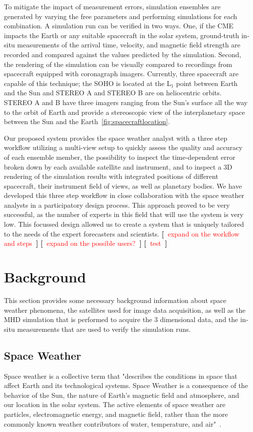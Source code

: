 \documentclass[journal]{vgtc}                %
\newcommand{\todo}[1] {\textbf{[~}\textcolor {red}{#1}\marginpar{\textcolor {red}{\centerline{{\Huge \textbf{!}}}}}\textbf{~]}}
\newcommand{\todo}[1] {\textbf{[~}\textcolor {red}{#1}\marginpar{\textcolor {red}{\centerline{{\Huge \textbf{!}}}}}\textbf{~]}}
\begin{document}
To mitigate the impact of measurement errors, simulation ensembles are generated by varying the free parameters and performing simulations for each combination. A simulation run can be verified in two ways. One, if the CME impacts the Earth or any suitable spacecraft in the solar system, ground-truth in-situ measurements of the arrival time, velocity, and magnetic field strength are recorded and compared against the values predicted by the simulation. Second, the rendering of the simulation can be visually compared to recordings from spacecraft equipped with coronagraph imagers. Currently, three spacecraft are capable of this technique; the SOHO is located at the L$_1$ point between Earth and the Sun and STEREO A and STEREO B are on heliocentric orbits. STEREO A and B have three imagers ranging from the Sun's surface all the way to the orbit of Earth and provide a stereoscopic view of the interplanetary space between the Sun and the Earth~\ref{fig:spacecraftlocation}.

Our proposed system provides the space weather analyst with a three step workflow utilizing a multi-view setup to quickly assess the quality and accuracy of each ensemble member, the possibility to inspect the time-dependent error broken down by each available satellite and instrument, and to inspect a 3D rendering of the simulation results with integrated positions of different spacecraft, their instrument field of views, as well as planetary bodies. We have developed this three step workflow in close collaboration with the space weather analysts in a participatory design process. This approach proved to be very successful, as the number of experts in this field that will use the system is very low. This focussed design allowed us to create a system that is uniquely tailored to the needs of the expert forecasters and scientists. \todo{expand on the workflow and steps} \todo{expand on the possible users?} \todo{test}

\section{Background}
This section provides some necessary background information about space weather phenomena, the satellites used for image data acquisition, as well as the MHD simulation that is performed to acquire the 3 dimensional data, and the in-situ measurements that are used to verify the simulation runs.

\subsection{Space Weather}
Space weather is a collective term that "describes the conditions in space that affect Earth and its technological systems. Space Weather is a consequence of the behavior of the Sun, the nature of Earth’s magnetic field and atmosphere, and our location in the solar system. The active elements of space weather are particles, electromagnetic energy, and magnetic field, rather than the more commonly known weather contributors of water, temperature, and air"~\cite{noaaprofile}.
\end{document}
